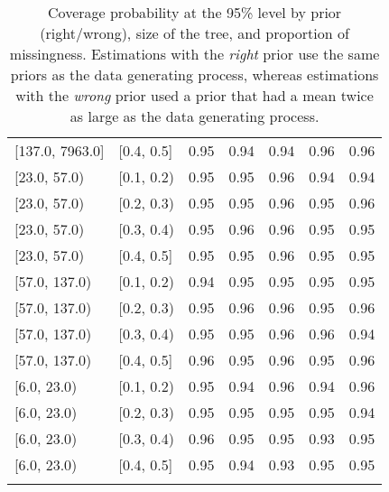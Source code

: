 \begin{table}[ht]
\begin{tabular}{llrrrrr}
  {[137.0, 7963.0]} & {[0.4, 0.5]} & 0.95 & 0.94 & 0.94 & 0.96 & 0.96 \\ 
  {[23.0, 57.0)} & {[0.1, 0.2)} & 0.95 & 0.95 & 0.96 & 0.94 & 0.94 \\ 
  {[23.0, 57.0)} & {[0.2, 0.3)} & 0.95 & 0.95 & 0.96 & 0.95 & 0.96 \\ 
  {[23.0, 57.0)} & {[0.3, 0.4)} & 0.95 & 0.96 & 0.96 & 0.95 & 0.95 \\ 
  {[23.0, 57.0)} & {[0.4, 0.5]} & 0.95 & 0.95 & 0.96 & 0.95 & 0.95 \\ 
  {[57.0, 137.0)} & {[0.1, 0.2)} & 0.94 & 0.95 & 0.95 & 0.95 & 0.95 \\ 
  {[57.0, 137.0)} & {[0.2, 0.3)} & 0.95 & 0.96 & 0.96 & 0.95 & 0.96 \\ 
  {[57.0, 137.0)} & {[0.3, 0.4)} & 0.95 & 0.95 & 0.96 & 0.96 & 0.94 \\ 
  {[57.0, 137.0)} & {[0.4, 0.5]} & 0.96 & 0.95 & 0.96 & 0.95 & 0.96 \\ 
  {[6.0, 23.0)} & {[0.1, 0.2)} & 0.95 & 0.94 & 0.96 & 0.94 & 0.96 \\ 
  {[6.0, 23.0)} & {[0.2, 0.3)} & 0.95 & 0.95 & 0.95 & 0.95 & 0.94 \\ 
  {[6.0, 23.0)} & {[0.3, 0.4)} & 0.96 & 0.95 & 0.95 & 0.93 & 0.95 \\ 
  {[6.0, 23.0)} & {[0.4, 0.5]} & 0.95 & 0.94 & 0.93 & 0.95 & 0.95 \\ 
   \bottomrule
\multicolumn{7}{l}{}\\
\end{tabular}
\caption{Coverage probability at the 95\% level by prior (right/wrong), size of the tree, and proportion of missingness.  Estimations with the \emph{right} prior use the same priors as the data generating process, whereas estimations with the \emph{wrong} prior used a prior that had a mean twice as large as the data generating process.} 
\label{tab:coverage95-method-size-missigness}
\end{table}
